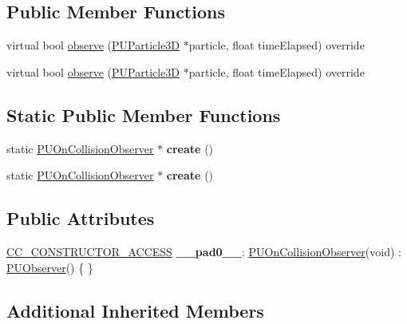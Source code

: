 \subsection*{Public Member Functions}
\begin{DoxyCompactItemize}
\item 
virtual bool \hyperlink{classPUOnCollisionObserver_ab3b3d75044d271697792ff7f6d7eff4e}{observe} (\hyperlink{structPUParticle3D}{P\+U\+Particle3D} $\ast$particle, float time\+Elapsed) override
\item 
virtual bool \hyperlink{classPUOnCollisionObserver_a59b536488e3a91560d8e3d730b860185}{observe} (\hyperlink{structPUParticle3D}{P\+U\+Particle3D} $\ast$particle, float time\+Elapsed) override
\end{DoxyCompactItemize}
\subsection*{Static Public Member Functions}
\begin{DoxyCompactItemize}
\item 
\mbox{\label{classPUOnCollisionObserver_ad74bb493d56052ceced2d8308fefdd07}} 
static \hyperlink{classPUOnCollisionObserver}{P\+U\+On\+Collision\+Observer} $\ast$ {\bfseries create} ()
\item 
\mbox{\label{classPUOnCollisionObserver_a375826509e034159ec5de3dd7f7f55c6}} 
static \hyperlink{classPUOnCollisionObserver}{P\+U\+On\+Collision\+Observer} $\ast$ {\bfseries create} ()
\end{DoxyCompactItemize}
\subsection*{Public Attributes}
\begin{DoxyCompactItemize}
\item 
\mbox{\label{classPUOnCollisionObserver_a9d1ea395e3f2a15bc29087bef3bc87c7}} 
\hyperlink{_2cocos2d_2cocos_2base_2ccConfig_8h_a25ef1314f97c35a2ed3d029b0ead6da0}{C\+C\+\_\+\+C\+O\+N\+S\+T\+R\+U\+C\+T\+O\+R\+\_\+\+A\+C\+C\+E\+SS} {\bfseries \+\_\+\+\_\+pad0\+\_\+\+\_\+}\+: \hyperlink{classPUOnCollisionObserver}{P\+U\+On\+Collision\+Observer}(void) \+: \hyperlink{classPUObserver}{P\+U\+Observer}() \{ \}
\end{DoxyCompactItemize}
\subsection*{Additional Inherited Members}


